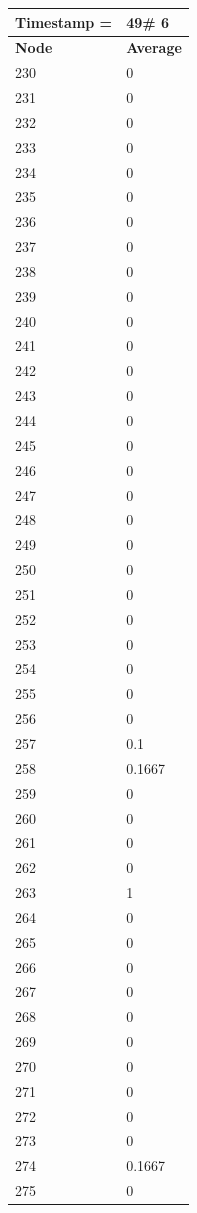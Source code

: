 \begin{tabular}{|l||l|}
\hline
\textbf{Timestamp =} & \textbf{49}\# 6\\\hline
	\textbf{Node} & \textbf{Average} \\ \hline
\hline
	230 & 0 \\ \hline
	231 & 0 \\ \hline
	232 & 0 \\ \hline
	233 & 0 \\ \hline
	234 & 0 \\ \hline
	235 & 0 \\ \hline
	236 & 0 \\ \hline
	237 & 0 \\ \hline
	238 & 0 \\ \hline
	239 & 0 \\ \hline
	240 & 0 \\ \hline
	241 & 0 \\ \hline
	242 & 0 \\ \hline
	243 & 0 \\ \hline
	244 & 0 \\ \hline
	245 & 0 \\ \hline
	246 & 0 \\ \hline
	247 & 0 \\ \hline
	248 & 0 \\ \hline
	249 & 0 \\ \hline
	250 & 0 \\ \hline
	251 & 0 \\ \hline
	252 & 0 \\ \hline
	253 & 0 \\ \hline
	254 & 0 \\ \hline
	255 & 0 \\ \hline
	256 & 0 \\ \hline
	257 & 0.1 \\ \hline
	258 & 0.1667 \\ \hline
	259 & 0 \\ \hline
	260 & 0 \\ \hline
	261 & 0 \\ \hline
	262 & 0 \\ \hline
	263 & 1 \\ \hline
	264 & 0 \\ \hline
	265 & 0 \\ \hline
	266 & 0 \\ \hline
	267 & 0 \\ \hline
	268 & 0 \\ \hline
	269 & 0 \\ \hline
	270 & 0 \\ \hline
	271 & 0 \\ \hline
	272 & 0 \\ \hline
	273 & 0 \\ \hline
	274 & 0.1667 \\ \hline
	275 & 0 \\ \hline
\end{tabular}

